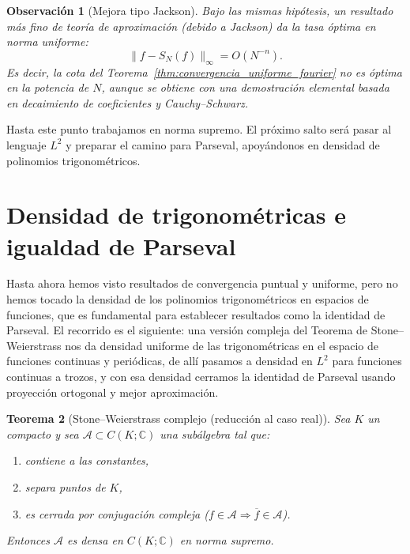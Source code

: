 \documentclass[a4paper,11pt]{report}
\newtheorem{theorem}{Teorema}[chapter]
\newtheorem{remark}[theorem]{Observación}
\begin{document}
\begin{remark}[Mejora tipo Jackson]
Bajo las mismas hip\'otesis, un resultado m\'as fino de teor\'ia de aproximaci\'on (debido a Jackson) da la tasa \emph{\'optima} en norma uniforme:
\[
\|f-S_N(f)\|_\infty = O(N^{-n}).
\]
Es decir, la cota del Teorema~\ref{thm:convergencia_uniforme_fourier} no es \'optima en la potencia de $N$, aunque se obtiene con una demostraci\'on elemental basada en decaimiento de coeficientes y Cauchy--Schwarz.
\end{remark}

Hasta este punto trabajamos en norma supremo. El pr\'oximo salto ser\'a pasar al lenguaje $L^2$ y preparar el camino para Parseval, apoy\'andonos en densidad de polinomios trigonom\'etricos.


\section{Densidad de trigonom\'etricas e igualdad de Parseval}

Hasta ahora hemos visto resultados de convergencia puntual y uniforme, pero no hemos tocado la densidad de los polinomios trigonom\'etricos en espacios de funciones, que es fundamental para establecer resultados como la identidad de Parseval. El recorrido es el siguiente: una versión compleja del Teorema de Stone--Weierstrass nos da densidad uniforme de las trigonométricas en el espacio de funciones continuas y peri\'odicas, de all\'i pasamos a densidad en $L^2$ para funciones continuas a trozos, y con esa densidad cerramos la identidad de Parseval usando proyecci\'on ortogonal y mejor aproximaci\'on.

\begin{theorem}[Stone--Weierstrass complejo (reducci\'on al caso real)]\label{thm:stone_weierstrass_complejo}
Sea $K$ un compacto y sea $\mathcal A\subset C(K;\mathbb C)$ una sub\'algebra tal que:
\begin{enumerate}
\item contiene a las constantes,
\item separa puntos de $K$,
\item es cerrada por conjugaci\'on compleja ($f\in\mathcal A\Rightarrow \overline f\in\mathcal A$).
\end{enumerate}
Entonces $\mathcal A$ es densa en $C(K;\mathbb C)$ en norma supremo.
\end{theorem}
\end{document}
